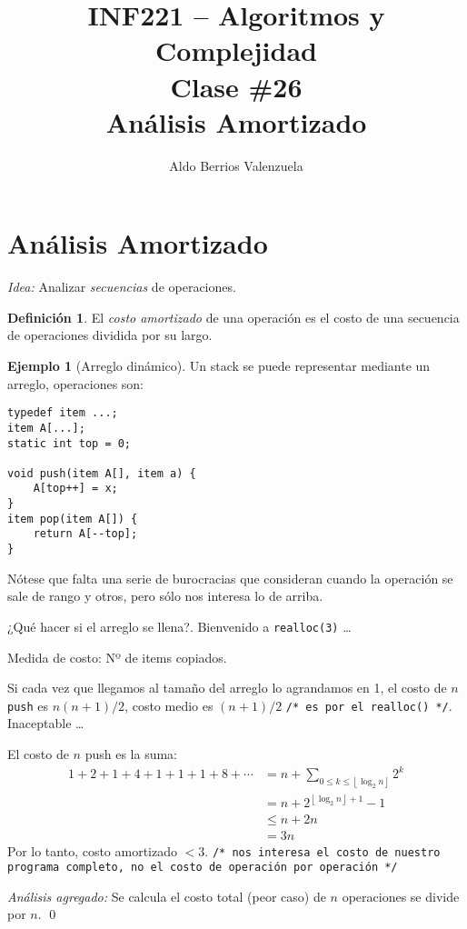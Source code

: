 \documentclass[english, spanish, fleqn, 10pt]{article}
\title{INF221 -- Algoritmos y Complejidad\\[.4\baselineskip]
Clase \#26\\
Análisis Amortizado}
\author{Aldo Berrios Valenzuela}
\newcommand{\comentarioc}[1]{\texttt{\textcolor{webred}{/* #1 */}}}
\numberwithin{equation}{section}
\newcommand{\nparentesis}[1]{\left( #1 \right)}
\theoremstyle{definition}
\newtheorem{definition}{Definición}[section]
\newtheorem{beforeExample}{Ejemplo}[section]
\newenvironment{ejemplo}[1][]{\begin{beforeExample}[#1]\renewcommand{\qedsymbol}{$\blacksquare$}}{\qed\end{beforeExample}}
\begin{document}
\maketitle

\section{Análisis Amortizado}
\emph{Idea:} Analizar \emph{secuencias} de operaciones.

\begin{definition}
	El \emph{costo amortizado} de una operación es el costo de una secuencia de operaciones dividida por su largo.
\end{definition}

\begin{ejemplo}[Arreglo dinámico]
	Un stack se puede representar mediante un arreglo, operaciones son:
	\begin{lstlisting}
typedef item ...;
item A[...];
static int top = 0;

void push(item A[], item a) {
	A[top++] = x;
}
item pop(item A[]) {
	return A[--top];
}
	\end{lstlisting}
	Nótese que falta una serie de burocracias que consideran cuando la operación se sale de rango y otros, pero sólo nos interesa lo de arriba.
	
	¿Qué hacer si el arreglo se llena?. Bienvenido a \texttt{realloc(3)} \ldots
	
	Medida de costo: Nº de items copiados.
		
	Si cada vez que llegamos al tamaño del arreglo lo agrandamos en 1, el costo de $n$ \texttt{push} es $n\nparentesis{n+1}/2$, costo medio es $\nparentesis{n+1}/2$ \comentarioc{es por el realloc()}. Inaceptable \ldots
	
	El costo de $n$ push es la suma:
	\begin{align*}
	1 + 2 + 1 + 4 + 1 + 1 + 1 + 8 + \cdots &= n + \sum_{0 \leq k \leq \left\lfloor \log_2 n \right\rfloor} 2^k\\
	&= n + 2^{\left\lfloor \log_2 n \right\rfloor + 1} - 1\\
	&\leq n + 2n\\
	&= 3n
	\end{align*}
	Por lo tanto, costo amortizado $< 3$. \comentarioc{nos interesa el costo de nuestro programa completo, no el costo de operación por operación}
	
	\emph{Análisis agregado:} Se calcula el costo total (peor caso) de $n$ operaciones se divide por $n$.
\end{ejemplo}
	
\end{document}
